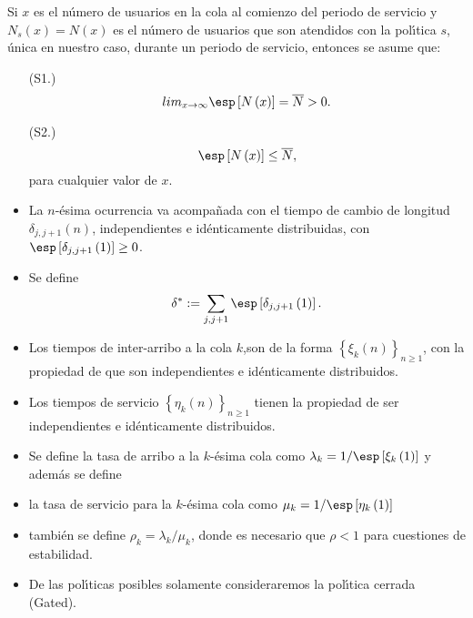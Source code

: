 Si $x$ es el n{\'u}mero de usuarios en la cola al comienzo del
periodo de servicio y $N_{s}\left(x\right)=N\left(x\right)$ es el
n{\'u}mero de usuarios que son atendidos con la pol{\'\i}tica $s$,
{\'u}nica en nuestro caso, durante un periodo de servicio,
entonces se asume que:
\begin{itemize}
\item[(S1.)]
\begin{equation}\label{S1}
lim_{x\rightarrow\infty}\esp\left[N\left(x\right)\right]=\overline{N}>0.
\end{equation}
\item[(S2.)]
\begin{equation}\label{S2}
\esp\left[N\left(x\right)\right]\leq \overline{N}, \end{equation}
para cualquier valor de $x$. \item La $n$-{\'e}sima ocurrencia va
acompa{\~n}ada con el tiempo de cambio de longitud
$\delta_{j,j+1}\left(n\right)$, independientes e id{\'e}nticamente
distribuidas, con
$\esp\left[\delta_{j,j+1}\left(1\right)\right]\geq0$. \item Se
define
\begin{equation}
\delta^{*}:=\sum_{j,j+1}\esp\left[\delta_{j,j+1}\left(1\right)\right].
\end{equation}

\item Los tiempos de inter-arribo a la cola $k$,son de la forma
$\left\{\xi_{k}\left(n\right)\right\}_{n\geq1}$, con la propiedad
de que son independientes e id{\'e}nticamente distribuidos.

\item Los tiempos de servicio
$\left\{\eta_{k}\left(n\right)\right\}_{n\geq1}$ tienen la
propiedad de ser independientes e id{\'e}nticamente distribuidos.

\item Se define la tasa de arribo a la $k$-{\'e}sima cola como
$\lambda_{k}=1/\esp\left[\xi_{k}\left(1\right)\right]$ y
adem{\'a}s se define

\item la tasa de servicio para la $k$-{\'e}sima cola como
$\mu_{k}=1/\esp\left[\eta_{k}\left(1\right)\right]$

\item tambi{\'e}n se define $\rho_{k}=\lambda_{k}/\mu_{k}$, donde
es necesario que $\rho<1$ para cuestiones de estabilidad.

\item De las pol{\'\i}ticas posibles solamente consideraremos la
pol{\'\i}tica cerrada (Gated).
\end{itemize}

